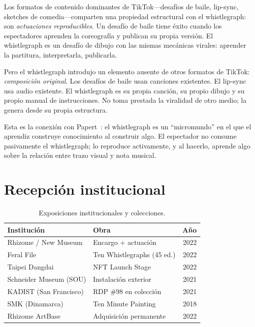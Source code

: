 \documentclass[10pt,letterpaper,twocolumn]{article}
\begin{document}
Los formatos de contenido dominantes de TikTok---desafíos de baile, lip-sync, sketches de comedia---comparten una propiedad estructural con el whistlegraph: son \emph{actuaciones reproducibles}. Un desafío de baile tiene éxito cuando los espectadores aprenden la coreografía y publican su propia versión. El whistlegraph es un desafío de dibujo con las mismas mecánicas virales: aprender la partitura, interpretarla, publicarla.

Pero el whistlegraph introdujo un elemento ausente de otros formatos de TikTok: \emph{composición original}. Los desafíos de baile usan canciones existentes. El lip-sync usa audio existente. El whistlegraph es su propia canción, su propio dibujo y su propio manual de instrucciones. No toma prestada la viralidad de otro medio; la genera desde su propia estructura.

Esta es la conexión con Papert~\citep{papert1980mindstorms}: el whistlegraph es un ``micromundo'' en el que el aprendiz construye conocimiento al construir algo. El espectador no consume pasivamente el whistlegraph; lo reproduce activamente, y al hacerlo, aprende algo sobre la relación entre trazo visual y nota musical.

\section{Recepción institucional}

\begin{table}[h]
\small
\centering
\begin{tabularx}{\columnwidth}{Xlr}
\toprule
\textbf{Institución} & \textbf{Obra} & \textbf{Año} \\
\midrule
Rhizome / New Museum & Encargo + actuación & 2022 \\
Feral File & Ten Whistlegraphs (45 ed.) & 2022 \\
Taipei Dangdai & NFT Launch Stage & 2022 \\
Schneider Museum (SOU) & Instalación exterior & 2021 \\
KADIST (San Francisco) & RDP \#98 en colección & 2021 \\
SMK (Dinamarca) & Ten Minute Painting & 2018 \\
Rhizome ArtBase & Adquisición permanente & 2022 \\
\bottomrule
\end{tabularx}
\caption{Exposiciones institucionales y colecciones.}
\label{tab:institutions}
\end{table}
\end{document}

